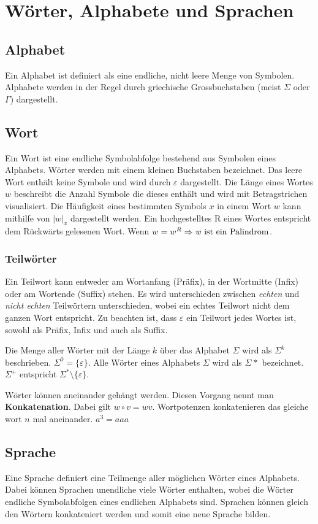 \documentclass{article}
\author{Philipp Kiss}
\begin{document}
\section{Wörter, Alphabete und Sprachen}
\subsection{Alphabet} 
Ein Alphabet ist definiert als eine endliche, nicht leere Menge von Symbolen. Alphabete werden in der Regel durch griechische Grossbuchstaben (meist $\Sigma$ oder $\Gamma$) dargestellt.
\subsection{Wort} 
Ein Wort ist eine endliche Symbolabfolge bestehend aus Symbolen eines Alphabets. Wörter werden mit einem kleinen Buchstaben bezeichnet. Das leere Wort enthält keine Symbole und wird durch $\varepsilon$ dargestellt. Die Länge eines Wortes  $w$ beschreibt die Anzahl Symbole die dieses enthält und wird mit Betragstrichen visualisiert. Die Häufigkeit eines bestimmten Symbols $x$ in einem Wort $w$ kann mithilfe von $|w|_x$ dargestellt werden. Ein hochgestelltes R eines Wortes entspricht dem Rückwärts gelesenen Wort. Wenn $w = w^{R} \Rightarrow \textrm{\textit{w}  ist ein Palindrom}$.
\subsubsection{Teilwörter}
Ein Teilwort kann entweder am Wortanfang (Präfix), in der Wortmitte (Infix) oder am Wortende (Suffix) stehen. Es wird unterschieden zwischen \textit{echten} und \textit{nicht echten} Teilwörtern unterschieden, wobei ein echtes Teilwort nicht dem ganzen Wort entspricht.
Zu beachten ist, dass $\varepsilon$ ein Teilwort jedes Wortes ist, sowohl als Präfix, Infix und auch als Suffix.

Die Menge aller Wörter mit der Länge $k$ über das Alphabet $\Sigma$ wird als $\Sigma^{k}$ beschrieben. $\Sigma^{0} = \{\varepsilon\}$. Alle Wörter eines Alphabets $\Sigma$ wird als $\Sigma^{}*$ bezeichnet. $\Sigma^{+}$ entspricht $\Sigma^{*} \setminus \{\varepsilon\}$.

Wörter können aneinander gehängt werden. Diesen Vorgang nennt man \textbf{Konkatenation}. Dabei gilt $w \circ v = wv$. Wortpotenzen konkatenieren das gleiche wort $n$ mal aneinander. $a^{3} = aaa$
\subsection{Sprache}
Eine Sprache definiert eine Teilmenge aller möglichen Wörter eines Alphabets. Dabei können Sprachen unendliche viele Wörter enthalten, wobei die Wörter endliche Symbolabfolgen eines endlichen Alphabets sind. Sprachen können gleich den Wörtern konkateniert werden und somit eine neue Sprache bilden.
\end{document}
